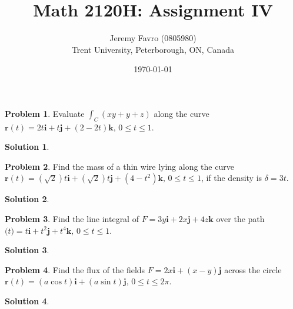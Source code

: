 \documentclass[10pt]{article}
\title{Math 2120H: Assignment IV}
\author{Jeremy Favro (0805980) \\ Trent University, Peterborough, ON, Canada}
\date{\today}
\theoremstyle{definition}
\newtheorem{problem}{Problem}
\newtheorem{soln}{Solution}
\newcommand{\ui}{\mathbf{i}}
\newcommand{\uj}{\mathbf{j}}
\newcommand{\uk}{\mathbf{k}}
\begin{document}
\maketitle

\begin{problem}
Evaluate $\int_C(xy+y+z)$ along the curve $\mathbf{r}(t)=2t\ui+t\uj+(2-2t)\uk,\,0\leq t\leq 1$.
\end{problem}
\begin{soln}
\end{soln}

\begin{problem}
Find the mass of a thin wire lying along the curve $\mathbf{r}(t)=(\sqrt{2})t\ui+(\sqrt{2})t\uj+(4-t^2)\uk,\,0\leq t\leq 1$, if the density is $\delta=3t$.
\end{problem}
\begin{soln}
\end{soln}

\begin{problem}
Find the line integral of $F = 3y\ui + 2x\uj + 4z\uk$ over the path $\mathbf(t) = t\ui + t^2\uj +t^4\uk,\,0 \leq t \leq 1$.
\end{problem}
\begin{soln}
\end{soln}

\begin{problem}
Find the flux of the fields $F = 2x\ui + (x - y)\uj$ across the circle $\mathbf{r}(t) =(a\cos t)\ui + (a\sin t)\uj,\,0\leq t \leq 2\pi$.
\end{problem}
\begin{soln}
\end{soln}
\end{document}

